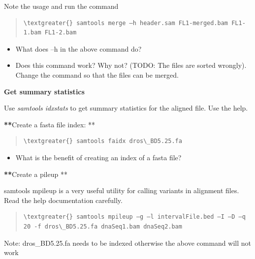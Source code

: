 \documentclass[letterpaper,10pt,english]{sphinxmanual}
\begin{document}
Note the usage and run the command
\begin{quote}

\begin{Verbatim}[commandchars=\\\{\}]
\textgreater{} samtools merge –h header.sam FL1-merged.bam FL1-1.bam FL1-2.bam
\end{Verbatim}
\end{quote}
\begin{itemize}
\item {} 
What does –h in the above command do?

\item {} 
Does this command work? Why not? (TODO: The files are sorted wrongly). Change the command so that the files can be merged.

\end{itemize}

\textbf{Get summary statistics}

Use \emph{samtools idxstats} to get summary statistics for the aligned file. Use the help.

{\color{red}\bfseries{}**}Create a fasta file index: **
\begin{quote}

\begin{Verbatim}[commandchars=\\\{\}]
\textgreater{} samtools faidx dros\_BD5.25.fa
\end{Verbatim}
\end{quote}
\begin{itemize}
\item {} 
What is the benefit of creating an index of a fasta file?

\end{itemize}

{\color{red}\bfseries{}**}Create a pileup **

samtools mpileup is a very useful utility for calling variants in alignment files. Read the help documentation carefully.
\begin{quote}

\begin{Verbatim}[commandchars=\\\{\}]
\textgreater{} samtools mpileup –g –l intervalFile.bed –I –D –q 20 -f dros\_BD5.25.fa dnaSeq1.bam dnaSeq2.bam
\end{Verbatim}
\end{quote}

Note: dros\_BD5.25.fa needs to be indexed otherwise the above command will not work
\end{document}
